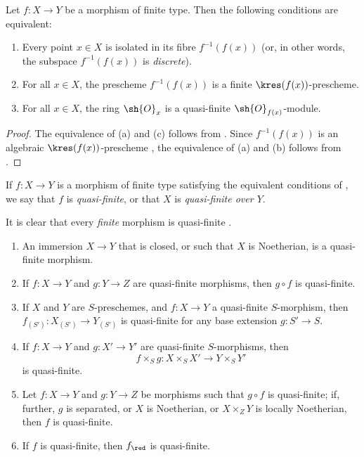 \begin{corollary}[6.2.2]
\label{II.6.2.2}
Let $f:X\to Y$ be a morphism of finite type.
Then the following conditions are equivalent:
\begin{enumerate}
  \item[a)] Every point $x\in X$ is isolated in its fibre $f^{-1}(f(x))$ (or, in other words, the subspace $f^{-1}(f(x))$ is \emph{discrete}).
  \item[b)] For all $x\in X$, the prescheme $f^{-1}(f(x))$ is a finite $\kres(f(x))$-prescheme.
  \item[c)] For all $x\in X$, the ring $\sh{O}_x$ is a quasi-finite $\sh{O}_{f(x)}$-module.
\end{enumerate}
\end{corollary}

\begin{proof}
The equivalence of (a) and (c) follows from .
Since $f^{-1}(f(x))$ is an algebraic $\kres(f(x))$-prescheme , the equivalence of (a) and (b) follows from .
\end{proof}

\begin{definition}[6.2.3]
\label{II.6.2.3}
If $f:X\to Y$ is a morphism of finite type satisfying the equivalent conditions of , we say that $f$ is \emph{quasi-finite}, or that $X$ is \emph{quasi-finite over $Y$}.
\end{definition}

It is clear that every \emph{finite} morphism is quasi-finite .

\begin{proposition}[6.2.4]
\label{II.6.2.4}
\medskip\noindent
\begin{enumerate}
  \item[(i)] An immersion $X\to Y$ that is closed, or such that $X$ is Noetherian, is a quasi-finite morphism.
  \item[(ii)] If $f:X\to Y$ and $g:Y\to Z$ are quasi-finite morphisms, then $g\circ f$ is quasi-finite.
  \item[(iii)] If $X$ and $Y$ are $S$-preschemes, and $f:X\to Y$ a quasi-finite $S$-morphism, then $f_{(S')}:X_{(S')}\to Y_{(S')}$ is quasi-finite for any base extension $g:S'\to S$.
  \item[(iv)] If $f:X\to Y$ and $g:X'\to Y'$ are quasi-finite $S$-morphisms, then
    \[
      f\times_S g : X\times_S X' \to Y\times_S Y'
    \]
    is quasi-finite.
  \item[(v)] Let $f:X\to Y$ and $g:Y\to Z$ be morphisms such that $g\circ f$ is quasi-finite; if, further, $g$ is separated, or $X$ is Noetherian, or $X\times_Z Y$ is locally Noetherian, then $f$ is quasi-finite.
  \item[(vi)] If $f$ is quasi-finite, then $f_\red$ is quasi-finite.
\end{enumerate}
\end{proposition}

